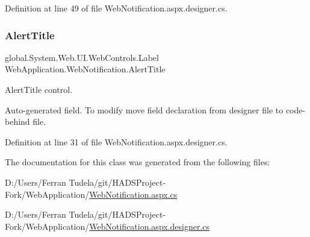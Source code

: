 Definition at line 49 of file Web\+Notification.\+aspx.\+designer.\+cs.

\mbox{\label{classWebApplication_1_1WebNotification_ae5e61b002ffea74359abf68c0ec09d7e}} 
\subsubsection{\texorpdfstring{AlertTitle}{AlertTitle}}
{\footnotesize\ttfamily global.\+System.\+Web.\+U\+I.\+Web\+Controls.\+Label Web\+Application.\+Web\+Notification.\+Alert\+Title\hspace{0.3cm}{\ttfamily [protected]}}



Alert\+Title control. 

Auto-\/generated field. To modify move field declaration from designer file to code-\/behind file. 

Definition at line 31 of file Web\+Notification.\+aspx.\+designer.\+cs.



The documentation for this class was generated from the following files\+:\begin{DoxyCompactItemize}
\item 
D\+:/\+Users/\+Ferran Tudela/git/\+H\+A\+D\+S\+Project-\/\+Fork/\+Web\+Application/\mbox{\hyperlink{WebNotification_8aspx_8cs}{Web\+Notification.\+aspx.\+cs}}\item 
D\+:/\+Users/\+Ferran Tudela/git/\+H\+A\+D\+S\+Project-\/\+Fork/\+Web\+Application/\mbox{\hyperlink{WebNotification_8aspx_8designer_8cs}{Web\+Notification.\+aspx.\+designer.\+cs}}\end{DoxyCompactItemize}

